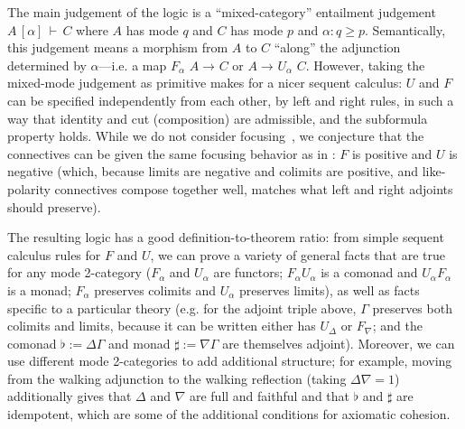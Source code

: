 \documentclass{drl-common/llncs}
\newcommand{\arrow}[3]{\ensuremath{#2 \longrightarrow_{#1} #3}}
\newcommand\F[2]{\ensuremath{F_{#1} \,\, #2}}
\newcommand\U[2]{\ensuremath{U_{#1} \,\, #2}}
\newcommand\seq[3]{\ensuremath{#1 \, [ #2 ] \, \vdash \, #3}}
\begin{document}
The main judgement of the logic is a ``mixed-category'' entailment
judgement \seq{A}{\alpha}{C} where $A$ has mode $q$ and $C$ has mode $p$
and $\alpha : q \ge p$.  Semantically, this judgement means a morphism
from $A$ to $C$ ``along'' the adjunction determined by $\alpha$---i.e. a
map $\arrow{}{\F \alpha A}{C}$ or $\arrow{}{A}{\U \alpha C}$.
However, taking the mixed-mode judgement as
primitive makes for a nicer sequent calculus: $U$ and $F$ can be
specified independently from each other, by left and right rules, in
such a way that identity and cut (composition) are admissible, and the
subformula property holds.  While we do not consider
focusing~\citep{andreoli92focus}, we conjecture that the connectives can
be given the same focusing behavior as in \citep{reed09adjoint}: $F$ is
positive and $U$ is negative (which, because limits are negative and
colimits are positive, and like-polarity connectives compose together
well, matches what left and right adjoints should preserve).

The resulting logic has a good definition-to-theorem ratio: from 
simple sequent calculus rules for $F$ and $U$, we can prove a variety of
general facts that are true for any mode 2-category ($F_\alpha$ and
$U_\alpha$ are functors; $F_\alpha U_\alpha$ is a comonad and $U_\alpha
F_\alpha$ is a monad; $F_\alpha$ preserves colimits and $U_\alpha$
preserves limits), as well as facts specific to a particular theory
(e.g. for the adjoint triple above, $\Gamma$ preserves both colimits
and limits, because it can be written either has $U_\Delta$ or $F_\nabla$; and the
comonad $\flat := \Delta\Gamma$ and monad $\sharp := \nabla\Gamma$ are
themselves adjoint).  Moreover, we can use different mode 2-categories
to add additional structure; for example, moving from the walking
adjunction to the walking reflection (taking $\Delta \nabla = 1$)
additionally gives that $\Delta$ and $\nabla$ are full and faithful and
that $\flat$ and $\sharp$ are idempotent, which are some of the
additional conditions for axiomatic cohesion.
\end{document}
